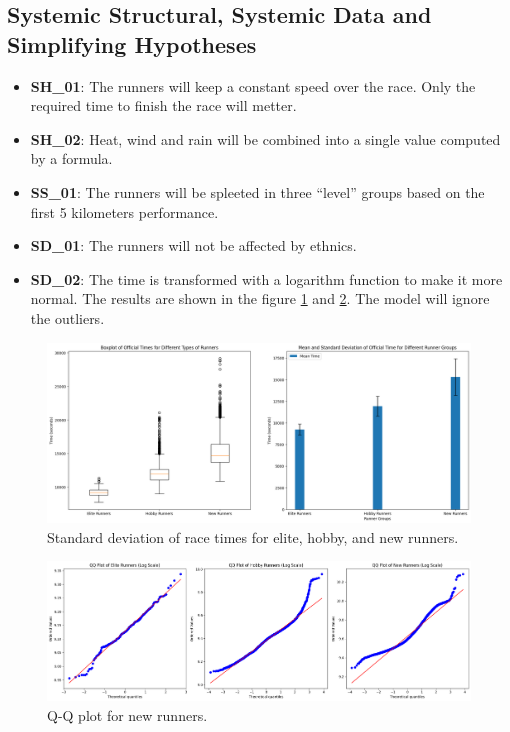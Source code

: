 \documentclass[conference]{IEEEtran}
\begin{document}
\subsection{Systemic Structural, Systemic Data and Simplifying Hypotheses}

\begin{itemize}
    \item \textbf{SH\_01}: The runners will keep a constant speed over the race. Only the required time to finish the race will metter.
    \item \textbf{SH\_02}: Heat, wind and rain will be combined into a single value computed by a formula.
    \item \textbf{SS\_01}: The runners will be spleeted in three ``level'' groups based on the first 5 kilometers performance.
    \item \textbf{SD\_01}: The runners will not be affected by ethnics.
    \item \textbf{SD\_02}: The time is transformed with a logarithm function to make it more normal. The results are shown in the figure \ref{fig:elite_hobby_new_standar_deviation} and \ref{fig:new_qq}. The model will ignore the outliers.
\end{itemize}

\begin{figure}[htbp]
    \centerline{\includegraphics[width=\linewidth]{figs/elite_hobby_new_standar_deviation.png}}
    \caption{Standard deviation of race times for elite, hobby, and new runners.}
    \label{fig:elite_hobby_new_standar_deviation}
\end{figure}

\begin{figure}[htbp]
    \centerline{\includegraphics[width=\linewidth]{figs/elite_hobby_new_qq.png}}
    \caption{Q-Q plot for new runners.}
    \label{fig:new_qq}
\end{figure}
\end{document}

